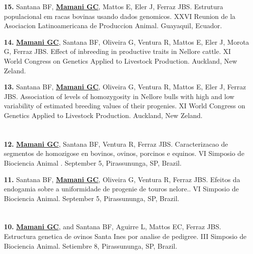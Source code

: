 \documentclass[margin,line,10pt]{res}
\newenvironment{list1}{
  \begin{list}{\ding{113}}{%
      \setlength{\itemsep}{0in}
      \setlength{\parsep}{0in} \setlength{\parskip}{0in}
      \setlength{\topsep}{0in} \setlength{\partopsep}{0in} 
      \setlength{\leftmargin}{0.17in}}}{\end{list}}
\begin{document}
\begin{resume}
\begin{list1}
\item [\bf{15}.] Santana BF, {\bf \underline{Mamani GC}}, Mattos E, Eler J, Ferraz JBS. 
Estrutura populacional em racas bovinas usando dados genomicos. 
XXVI Reunion de la Asociacion Latinoamericana de Produccion Animal. Guayaquil, Ecuador. 
\vspace{0.5cm}

\item [\bf{14}.] {\bf \underline{Mamani GC}}, Santana BF, Oliveira G, Ventura R, Mattos E, Eler J, Morota G, Ferraz JBS. 
Effect of inbreeding in productive traits in Nellore cattle.
XI World Congress on Genetics Applied to Livestock Production. Auckland, New Zeland. 
\vspace{0.5cm}

\item [\bf{13}.] Santana BF, {\bf \underline{Mamani GC}}, Oliveira G, Ventura R, Mattos E, Eler J, Ferraz JBS. 
Association of levels of homozygosity in Nellore bulls with high and low variability of estimated breeding values of their progenies.
XI World Congress on Genetics Applied to Livestock Production. Auckland, New Zeland. 
\end{list1}

\section{}
\begin{list1}
\item [\bf{12}.] {\bf \underline{Mamani GC}}, Santana BF,  Ventura R, Ferraz JBS. 
Caracterizacao de segmentos de homozigose en bovinos, ovinos, porcinos e equinos.
VI Simposio de Biociencia Animal . September 5, Pirassununga, SP, Brazil. 
\vspace{0.5cm}

\item [\bf{11}.] Santana BF, {\bf \underline{Mamani GC}}, Oliveira G,  Ventura R, Ferraz JBS. 
Efeitos da endogamia sobre a uniformidade de progenie de touros nelore..
VI Simposio de Biociencia Animal. September 5, Pirassununga, SP, Brazil. 
\end{list1}

\section{}
\begin{list1}
\item [\bf{10}.] {\bf \underline{Mamani GC}}, and Santana BF, Aguirre L, Mattos EC, Ferraz JBS. 
Estructura genetica de ovinos Santa Ines por analise de pedigree.
III Simposio de Biociencia Animal. Setiembre 8, Pirassununga, SP, Brazil. 
\end{list1}


\end{resume}
\end{document}
